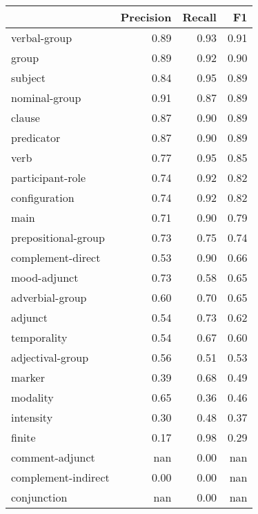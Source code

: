 \begin{table}[!ht]
\centering
\begin{tabular}{lrrr}
\toprule
{} &  Precision &  Recall &   F1 \\
\midrule
verbal-group              &       0.89 &    0.93 & 0.91 \\
group                     &       0.89 &    0.92 & 0.90 \\
subject                   &       0.84 &    0.95 & 0.89 \\
nominal-group             &       0.91 &    0.87 & 0.89 \\
clause                    &       0.87 &    0.90 & 0.89 \\
predicator                &       0.87 &    0.90 & 0.89 \\
verb                      &       0.77 &    0.95 & 0.85 \\
participant-role          &       0.74 &    0.92 & 0.82 \\
configuration             &       0.74 &    0.92 & 0.82 \\
main                      &       0.71 &    0.90 & 0.79 \\
prepositional-group       &       0.73 &    0.75 & 0.74 \\
complement-direct         &       0.53 &    0.90 & 0.66 \\
mood-adjunct              &       0.73 &    0.58 & 0.65 \\
adverbial-group           &       0.60 &    0.70 & 0.65 \\
adjunct                   &       0.54 &    0.73 & 0.62 \\
temporality               &       0.54 &    0.67 & 0.60 \\
adjectival-group          &       0.56 &    0.51 & 0.53 \\
marker                    &       0.39 &    0.68 & 0.49 \\
modality                  &       0.65 &    0.36 & 0.46 \\
intensity                 &       0.30 &    0.48 & 0.37 \\
finite                    &       0.17 &    0.98 & 0.29 \\
comment-adjunct           &        nan &    0.00 &  nan \\
complement-indirect       &       0.00 &    0.00 &  nan \\
conjunction               &        nan &    0.00 &  nan \\

\end{tabular}
\end{table}
